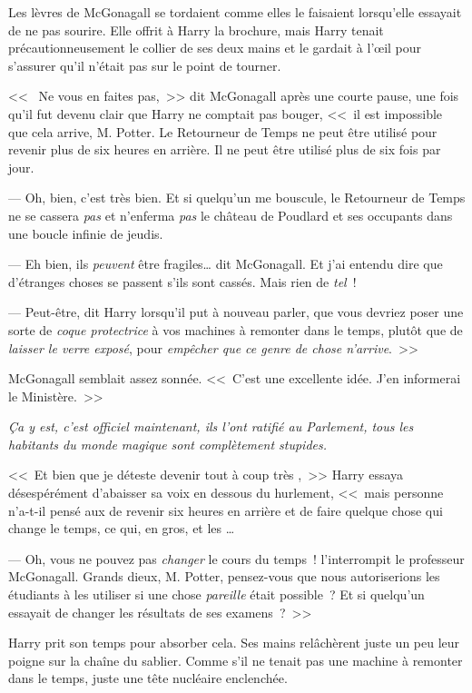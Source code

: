 Les lèvres de McGonagall se tordaient comme elles le faisaient lorsqu'elle essayait de ne pas sourire. Elle offrit à Harry la brochure, mais Harry tenait précautionneusement le collier de ses deux mains et le gardait à l'œil pour s'assurer qu'il n'était pas sur le point de tourner.

<<~ Ne vous en faites pas,~>> dit McGonagall après une courte pause, une fois qu'il fut devenu clair que Harry ne comptait pas bouger, <<~il est impossible que cela arrive, M. Potter. Le Retourneur de Temps ne peut être utilisé pour revenir plus de six heures en arrière. Il ne peut être utilisé plus de six fois par jour.

--- Oh, bien, c'est très bien. Et si quelqu'un me bouscule, le Retourneur de Temps ne se cassera \emph{pas} et n'enferma \emph{pas} le château de Poudlard et ses occupants dans une boucle infinie de jeudis.

--- Eh bien, ils \emph{peuvent} être fragiles… dit McGonagall. Et j'ai entendu dire que d'étranges choses se passent s'ils sont cassés. Mais rien de \emph{tel}~!

--- Peut-être, dit Harry lorsqu'il put à nouveau parler, que vous devriez poser une sorte de \emph{coque protectrice} à vos machines à remonter dans le temps, plutôt que de \emph{laisser le verre exposé}, pour \emph{empêcher que ce genre de chose n'arrive}.~>>

McGonagall semblait assez sonnée. <<~C'est une excellente idée. J'en informerai le Ministère.~>>

\emph{Ça y est, c'est officiel maintenant, ils l'ont ratifié au Parlement, tous les habitants du monde magique sont complètement stupides.}

<<~Et bien que je déteste devenir tout à coup très ,~>> Harry essaya désespérément d'abaisser sa voix en dessous du hurlement, <<~mais personne n'a-t-il pensé aux  de revenir six heures en arrière et de faire quelque chose qui change le temps, ce qui, en gros,  et les …

--- Oh, vous ne pouvez pas \emph{changer} le cours du temps~! l'interrompit le professeur McGonagall. Grands dieux, M. Potter, pensez-vous que nous autoriserions les étudiants à les utiliser si une chose \emph{pareille} était possible~? Et si quelqu'un essayait de changer les résultats de ses examens~?~>>

Harry prit son temps pour absorber cela. Ses mains relâchèrent juste un peu leur poigne sur la chaîne du sablier. Comme s'il ne tenait pas une machine à remonter dans le temps, juste une tête nucléaire enclenchée.

